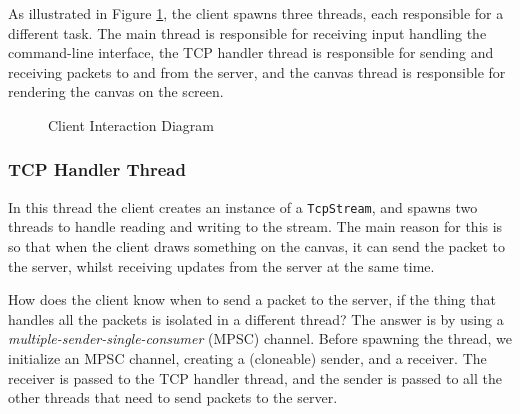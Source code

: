 \documentclass{article}
\newcommand{\code}[1]{\texttt{#1}}
\begin{document}
As illustrated in Figure \ref{fig:interaction_diagram}, the client spawns three
threads, each responsible for a different task. The main thread is responsible
for receiving input handling the command-line interface, the TCP
handler thread is responsible for sending and receiving packets to and from the
server, and the canvas thread is responsible for rendering the canvas on the
screen.

\begin{figure}[!htb]
    \centering
    \caption{Client Interaction Diagram}
    \label{fig:interaction_diagram}
\end{figure}

\subsubsection{TCP Handler Thread}

In this thread the client creates an instance of a \code{TcpStream}, and spawns
two threads to handle reading and writing to the stream. The main reason for
this is so that when the client draws something on the canvas, it can send the
packet to the server, whilst receiving updates from the server at the same time.

How does the client know when to send a packet to the server, if the thing that
handles all the packets is isolated in a different thread? The answer is by using a
\textit{multiple-sender-single-consumer} (MPSC) channel. Before spawning the thread, we
initialize an MPSC channel, creating a (cloneable) sender, and a receiver. The
receiver is passed to the TCP handler thread, and the sender is passed to all
the other threads that need to send packets to the server.
\end{document}
